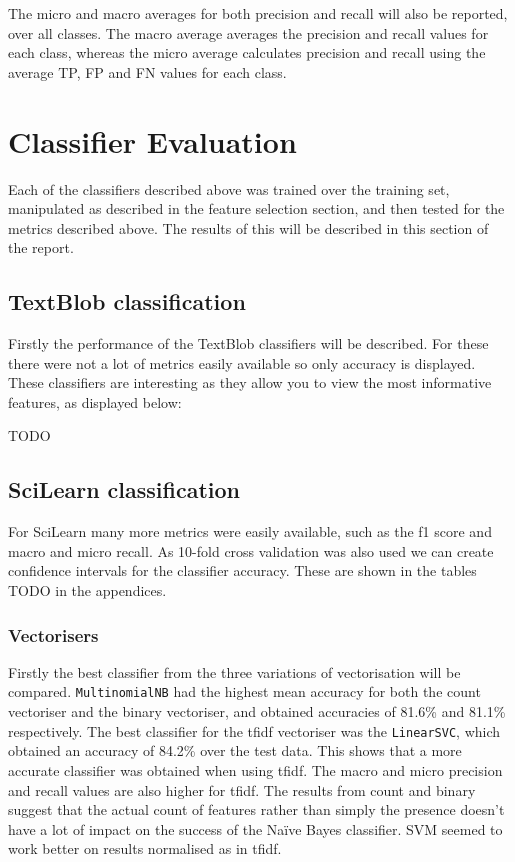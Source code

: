 \documentclass{article}
\begin{document}
The micro and macro averages for both precision and recall will also be reported, over all classes. The macro average averages the precision and recall values for each class, whereas the micro average calculates precision and recall using the average TP, FP and FN values for each class.

\section{Classifier Evaluation}
Each of the classifiers described above was trained over the training set, manipulated as described in the feature selection section, and then tested for the metrics described above. The results of this will be described in this section of the report.

\subsection{TextBlob classification}
Firstly the performance of the TextBlob classifiers will be described. For these there were not a lot of metrics easily available so only accuracy is displayed. These classifiers are interesting as they allow you to view the most informative features, as displayed below:

TODO

\subsection{SciLearn classification}
For SciLearn many more metrics were easily available, such as the f1 score and macro and micro recall. As 10-fold cross validation was also used we can create confidence intervals for the classifier accuracy. These are shown in the tables TODO in the appendices.

\subsubsection{Vectorisers}
Firstly the best classifier from the three variations of vectorisation will be compared. \verb|MultinomialNB| had the highest mean accuracy for both the count vectoriser and the binary vectoriser, and obtained accuracies of 81.6\% and 81.1\% respectively. The best classifier for the tfidf vectoriser was the  \verb|LinearSVC|, which obtained an accuracy of 84.2\% over the test data. This shows that a more accurate classifier was obtained when using tfidf. The macro and micro precision and recall values are also higher for tfidf. The results from count and binary suggest that the actual count of features rather than simply the presence doesn't have a lot of impact on the success of the Na{\"i}ve Bayes classifier. SVM seemed to work better on results normalised as in tfidf.
\end{document}
